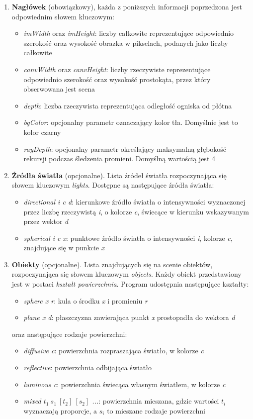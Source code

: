 \documentclass[11pt,a4paper]{article}
\begin{document}
\begin{enumerate}
\item\textbf{Nagłówek} (obowiązkowy), każda z poniższych informacji poprzedzona jest odpowiednim słowem kluczowym:
\begin{itemize}
\item\textit{imWidth} oraz \textit{imHeight}: liczby całkowite reprezentujące odpowiednio szerokość oraz wysokość obrazka w pikselach, podanych jako liczby całkowite
\item\textit{canvWidth} oraz \textit{canvHeight}: liczby rzeczywiste reprezentujące odpowiednio szerokość oraz wysokość prostokąta, przez który obserwowana jest scena
\item\textit{depth}: liczba rzeczywista reprezentująca odległość ogniska od płótna
\item\textit{bgColor}: opcjonalny parametr oznaczający kolor tła. Domyślnie jest to kolor czarny
\item\textit{rayDepth}: opcjonalny parametr określający maksymalną głębokość rekursji podczas śledzenia promieni. Domyślną wartością jest 4
\end{itemize}
\item\textbf{Źródła światła} (opcjonalne). Lista źródeł światła rozpoczynająca się słowem kluczowym \textit{lights}. Dostępne są następujące źródła światła:
\begin{itemize}
\item\textit{directional i c d}: kierunkowe źródło światła o intensywności wyznaczonej przez liczbę rzeczywistą \textit{i}, o kolorze \textit{c}, świecące w kierunku wskazywanym przez wektor \textit{d}
\item\textit{spherical i c x}: punktowe źródło światła o intensywności \textit{i}, kolorze \textit{c}, znajdujące się w punkcie \textit{x}
\end{itemize}
\item\textbf{Obiekty} (opcjonalne). Lista znajdujących się na scenie obiektów, rozpoczynająca się słowem kluczowym \textit{objects}. Każdy obiekt przedstawiony jest w postaci \textit{kształt powierzchnia}. Program udostępnia następujące kształty:
\begin{itemize}
\item\textit{sphere x r}: kula o środku \textit{x} i promieniu \textit{r}
\item\textit{plane x d}: płaszczyzna zawierająca punkt \textit{x} prostopadła do wektora \textit{d}
\end{itemize}
oraz następujące rodzaje powierzchni:
\begin{itemize}
\item\textit{diffusive c}: powierzchnia rozpraszająca światło, w kolorze \textit{c}
\item\textit{reflective}: powierzchnia odbijająca światło
\item\textit{luminous c}: powierzchnia świecąca własnym światłem, w kolorze \textit{c}
\item\textit{mixed $t_{1}\ s_{1}\ [t_{2}]\ [s_{2}]$ ...}: powierzchnia mieszana, gdzie wartości \textit{$t_{i}$} wyznaczają proporcje, a \textit{$s_{i}$} to mieszane rodzaje powierzchni
\end{itemize}
\end{enumerate}
\end{document}
